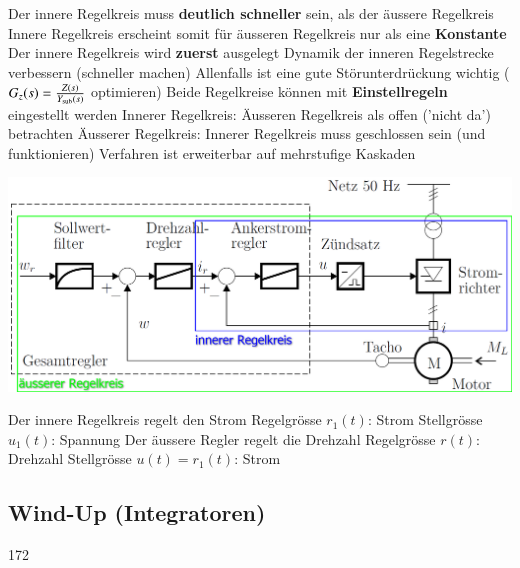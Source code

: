 \begin{outline}
    \1 Der innere Regelkreis muss \textbf{deutlich schneller} sein, als der äussere Regelkreis
        \2 Innere Regelkreis erscheint somit für äusseren Regelkreis nur als eine \textbf{Konstante}
    \1 Der innere Regelkreis wird \textbf{zuerst} ausgelegt
        \2 Dynamik der inneren Regelstrecke verbessern (schneller machen)
        \2 Allenfalls ist eine gute Störunterdrückung wichtig ($G_z(s) = \frac{Z(s)}{Y_{\rm sub}(s)}$ optimieren)
    \1 Beide Regelkreise können mit \textbf{Einstellregeln} eingestellt werden
        \2 Innerer Regelkreis: Äusseren Regelkreis als offen ('nicht da') betrachten
        \2 Äusserer Regelkreis: Innerer Regelkreis muss geschlossen sein (und funktionieren)
    \1 Verfahren ist erweiterbar auf mehrstufige Kaskaden
\end{outline}



\begin{minipage}[c]{0.5\columnwidth}
    \includegraphics[width=\columnwidth]{images/kaskadenregelung_beispiel.png}
\end{minipage}
\hfill
\begin{minipage}[c]{0.48\columnwidth}
    \begin{outline}
        \1 Der innere Regelkreis regelt den Strom
            \2 Regelgrösse $r_1(t)$: Strom
            \2 Stellgrösse $u_1(t)$: Spannung
        \1 Der äussere Regler regelt die Drehzahl
        \2 Regelgrösse $r(t)$: Drehzahl
        \2 Stellgrösse $u(t) = r_1(t)$: Strom
    \end{outline}
\end{minipage}


\subsection{Wind-Up (Integratoren)}{172}

